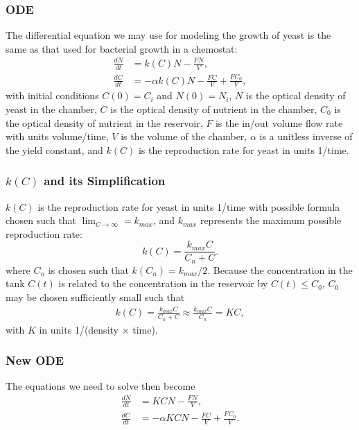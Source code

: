 \documentclass{beamer}
\begin{document}
\begin{frame}
  \frametitle{ODE}
  The differential equation we may use for modeling the growth of yeast is the same as that used for bacterial growth in a chemostat:
  \begin{align*}
    \frac{dN}{dt} &= k(C) N - \frac{FN}{V}, \\
    \frac{dC}{dt} &= -\alpha k(C) N - \frac{FC}{V} + \frac{FC_0}{V},
  \end{align*}
  with initial conditions $C(0) = C_i$ and $N(0) = N_i$, $N$ is the optical density of yeast in the chamber, $C$ is the optical density of nutrient in the chamber, $C_0$ is the optical density of nutrient in the reservoir, $F$ is the in/out volume flow rate with units volume/time, $V$ is the volume of the chamber, $\alpha$ is a unitless inverse of the yield constant, and $k(C)$ is the reproduction rate for yeast in units 1/time.
\end{frame}

\begin{frame}
  \frametitle{$k(C)$ and its Simplification}
  $k(C)$ is the reproduction rate for yeast in units 1/time with possible formula chosen such that $\lim_{C \rightarrow \infty} = k_{max}$, and $k_{max}$ represents the maximum possible reproduction rate:
  $$k(C) = \frac{k_{max} C}{C_n + C}.$$
  where $C_n$ is chosen such that $k(C_n) = k_{max} / 2$.  Because the concentration in the tank $C(t)$ is related to the concentration in the reservoir by $C(t) \leq C_0$, $C_0$ may be chosen sufficiently small such that 
  \begin{align*}
    k(C) = \frac{k_{max} C}{C_n + C} \approx \frac{k_{max} C}{C_n} = KC,
  \end{align*}
  with $K$ in units 1/(density $\times$ time).
\end{frame}

\begin{frame}
  \frametitle{New ODE}
  The equations we need to solve then become 
  \begin{align}
    \frac{dN}{dt} &= KCN - \frac{FN}{V}, \\
    \frac{dC}{dt} &= -\alpha KCN - \frac{FC}{V} + \frac{FC_0}{V}.
  \end{align}
\end{frame}
\end{document}
